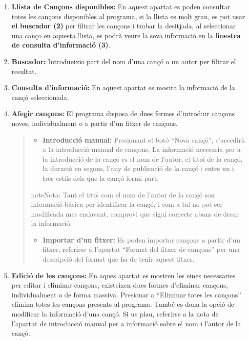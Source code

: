 \documentclass[a4paper,10pt,oneside]{sphinxmanual}
\begin{document}
\begin{enumerate}
\item {} 
\textbf{Llista de Cançons disponibles:} En aquest apartat es poden consultar totes les cançons disponibles al programa, si la llista es molt gran, es pot usar \textbf{el buscador (2)} per filtrar les cançons i trobar la desitjada, al seleccionar una canço en aquesta llista, es podrà veure la seva informació en la \textbf{finestra de consulta d'informació (3)}.

\item {} 
\textbf{Buscador:} Introdueixio part del nom d'una cançó o un autor per filtrar el resultat.

\item {} 
\textbf{Consulta d'informació:} En aquest apartat es mostra la informació de la cançó seleccionada.

\item {} 
\textbf{Afegir cançons:} El programa disposa de dues formes d'introduir cançons noves, individualment o a partir d'un fitxer de cançons.
\begin{quote}
\begin{itemize}
\item {} 
\textbf{Introducció manual:} Presionant el botó ``Nova cançó'', s'accedirà a la introducció manual de cançons, La informació necesaria per a la introducció de la cançó es el nom de l'autor, el titol de la cançó, la duració en segons, l'any de publicació de la cançó i entre un i tres estils dels que la cançó formi part.

\end{itemize}

\begin{notice}{note}{Nota:}
Tant el titol com el nom de l'autor de la cançó son informació bàsica per identificar la cançó, i com a tal no pot ser modificada mes endavant, comprovi que sigui correcte abans de desar la informació.
\end{notice}
\begin{itemize}
\item {} 
\textbf{Importar d'un fitxer:} Es poden importar cançons a partir d'un fitxer, referirse a l'apartat ``Format del fitxer de cançons'' per una descripció del format que ha de tenir aquest fitxer.

\end{itemize}
\end{quote}

\item {} 
\textbf{Edició de les cançons:} En aques apartat es mostren les eines necessaries per editar i eliminar cançons, existeixen dues formes d'eliminar cançons, individualment o de forma massiva. Presionar a ``Eliminar totes les cançons'' elimina totes les cançons presents al programa. També es dona la opció de modificar la informació d'una cançó. Si us plau, referirse a la nota de l'apartat de introducció manual per a informació sobre el nom i l'autor de la cançó.

\end{enumerate}
\end{document}
